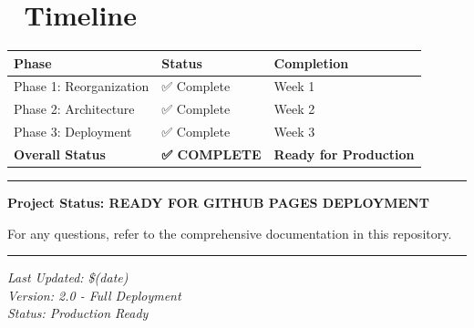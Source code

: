 \documentclass[
  11pt,
  oneside,
  openany]{scrbook}
\begin{document}
\chapter{📝 Timeline}\label{timeline}

\begin{longtable}[]{@{}lll@{}}
\toprule\noalign{}
Phase & Status & Completion \\
\midrule\noalign{}
\endhead
\bottomrule\noalign{}
\endlastfoot
Phase 1: Reorganization & ✅ Complete & Week 1 \\
Phase 2: Architecture & ✅ Complete & Week 2 \\
Phase 3: Deployment & ✅ Complete & Week 3 \\
\textbf{Overall Status} & \textbf{✅ COMPLETE} & \textbf{Ready for
Production} \\
\end{longtable}

\begin{center}\rule{0.5\linewidth}{0.5pt}\end{center}

\textbf{Project Status: READY FOR GITHUB PAGES DEPLOYMENT} 🚀

For any questions, refer to the comprehensive documentation in this
repository.

\begin{center}\rule{0.5\linewidth}{0.5pt}\end{center}

\emph{Last Updated: \$(date)}\\
\emph{Version: 2.0 - Full Deployment}\\
\emph{Status: Production Ready}


\backmatter
\end{document}
